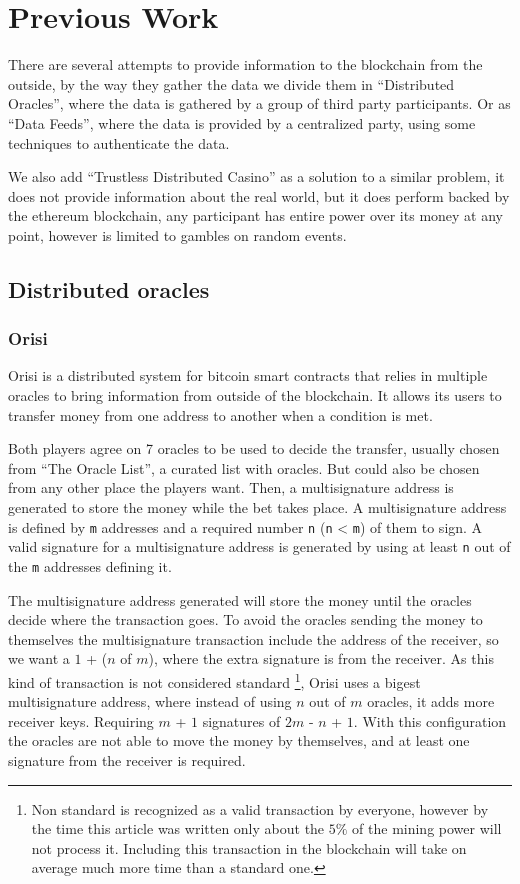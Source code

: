 \section{Previous Work} \label{sec:previous_work}

There are several attempts to provide information to the blockchain from the
  outside, by the way they gather the data we divide them in
  ``Distributed Oracles'', where the data is gathered by a group of third party
  participants. Or as ``Data Feeds'', where the data is provided by a
  centralized party, using some techniques to authenticate the data.

We also add ``Trustless Distributed Casino'' as a solution to a similar problem,
  it does not provide information about the real world, but it does perform
  backed by the ethereum blockchain, any participant has entire power over its
  money at any point, however is limited to gambles on random events.

\subsection{Distributed oracles}
\subsubsection{Orisi}
Orisi\cite{orisiwhitepaper} is a distributed system for bitcoin smart
  contracts that relies in multiple oracles to bring information from outside
  of the blockchain.
It allows its users to transfer money from one address to another when a
  condition is met.

Both players agree on 7 oracles to be used to decide the transfer, usually
  chosen from ``The Oracle List'', a curated list with oracles. But could also
  be chosen from any other place the players want. Then, a multisignature
  address is generated to store the money while the bet takes place.
A multisignature address is defined by \texttt{m} addresses and a required
  number \texttt{n} (\texttt{n} < \texttt{m}) of them to sign. A valid
  signature for a multisignature address is generated by using at least
  \texttt{n} out of the \texttt{m} addresses defining it.

The multisignature address generated will store the money until the oracles
  decide where the transaction goes. To avoid the oracles sending the money
  to themselves the multisignature transaction include the address of the
  receiver, so we want a $1$ + ($n$ of $m$), where the extra signature is
  from the receiver. As this kind of transaction is not considered standard
  \footnote{Non standard is recognized as a valid transaction by everyone,
  however by the time this article was written only about the $5\%$ of the
  mining power will not process it. Including this transaction in the
  blockchain will take on average much more time than a standard one.},
  Orisi uses a bigest multisignature address, where instead of using
  $n$ out of $m$ oracles, it adds more receiver keys. Requiring $m$ + $1$
  signatures of $2m$ - $n$ + $1$. With this configuration the oracles are
  not able to move the money by themselves, and at least one signature
  from the receiver is required.

